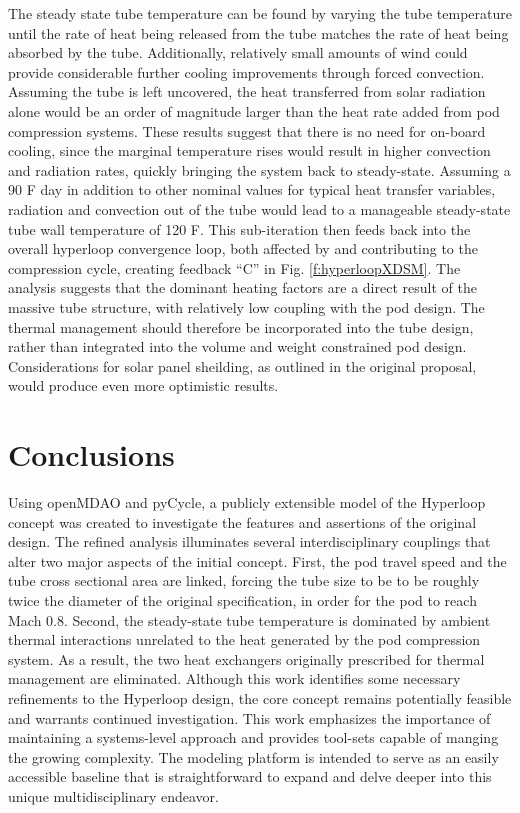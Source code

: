 \documentclass[heading.tex]{subfiles}
\begin{document}
The steady state tube temperature can be found by varying the tube temperature until the
rate of heat being released from the tube matches the rate of heat being absorbed by the tube.
Additionally, relatively small amounts of wind could provide
considerable further cooling improvements through forced convection.
Assuming the tube is left uncovered, the heat transferred from solar radiation alone would be an order of
magnitude larger than the heat rate added from pod compression systems.
These results suggest that there is no need for on-board cooling, since the marginal temperature
rises would result in higher convection and radiation rates, quickly bringing the system back to steady-state.
Assuming a 90 \degree F day in addition to other nominal values for typical heat transfer variables,
radiation and convection out of the tube would lead to a manageable steady-state tube wall temperature of 120 \degree F.
This sub-iteration then feeds back into the overall hyperloop convergence loop, both affected by
and contributing to the compression cycle, creating feedback “C” in Fig. \ref{f:hyperloopXDSM}.
The analysis suggests that the dominant heating factors are a direct result of the massive tube structure,
with relatively low coupling with the pod design.
The thermal management should therefore be incorporated into the tube design, rather than integrated into the volume and weight constrained pod design.
Considerations for solar panel sheilding, as outlined in the original proposal, would produce even more optimistic results.


\section{Conclusions}

Using openMDAO and pyCycle, a publicly extensible model of the Hyperloop concept was created 
to investigate the features and assertions of the original design. 
The refined analysis illuminates several
interdisciplinary couplings that alter two major aspects of the initial concept.
First, the pod travel speed and the tube cross sectional area are linked, forcing 
the tube size to be to be roughly twice the diameter of the original specification, in order for the 
pod to reach Mach 0.8. Second, the steady-state tube temperature is dominated by ambient thermal interactions
unrelated to the heat generated by the pod compression system.
As a result, the two heat exchangers originally prescribed for thermal management are eliminated.
Although this work identifies some necessary refinements to the Hyperloop design, the core 
concept remains potentially feasible and warrants continued investigation. 
This work emphasizes the importance of maintaining a systems-level approach
and provides tool-sets capable of manging the growing complexity.
The modeling platform is intended to serve as an easily accessible baseline that is straightforward to
expand and delve deeper into this unique multidisciplinary endeavor.
\end{document}
